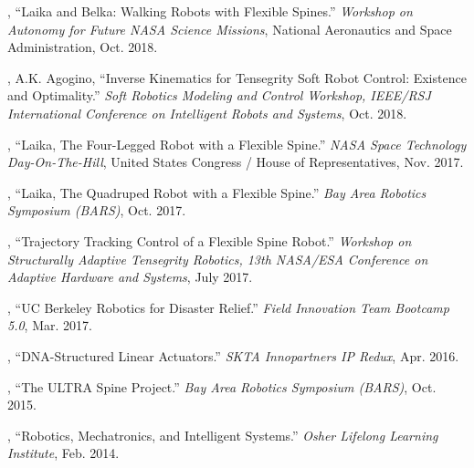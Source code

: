 \documentclass[letterpaper]{deedy-resume} %
\begin{document}
{\begin{etaremune}[itemsep=0.1cm]
\item \underline{{}}, ``Laika and Belka: Walking Robots with Flexible Spines.'' {\it Workshop on Autonomy for Future NASA Science Missions}, National Aeronautics and Space Administration, Oct. 2018.

\item \underline{{}}, A.K. Agogino, ``Inverse Kinematics for Tensegrity Soft Robot Control: Existence and Optimality.'' {\it Soft Robotics Modeling and Control Workshop, IEEE/RSJ International Conference on Intelligent Robots and Systems}, Oct. 2018.

\item \underline{{}}, ``Laika, The Four-Legged Robot with a Flexible Spine.'' {\it NASA Space Technology Day-On-The-Hill}, United States Congress / House of Representatives, Nov. 2017.

\item \underline{{}}, ``Laika, The Quadruped Robot with a Flexible Spine.'' {\it Bay Area Robotics Symposium (BARS)}, Oct. 2017.

\item \underline{{}}, ``Trajectory Tracking Control of a Flexible Spine Robot.'' {\it Workshop on Structurally Adaptive Tensegrity Robotics, 13th NASA/ESA Conference on Adaptive Hardware and Systems}, July 2017.

\item \underline{{}}, ``UC Berkeley Robotics for Disaster Relief.'' {\it Field Innovation Team Bootcamp 5.0}, Mar. 2017.

\item \underline{{}}, ``DNA-Structured Linear Actuators.'' {\it  SKTA Innopartners IP Redux}, Apr. 2016.

\item \underline{{}}, ``The ULTRA Spine Project.'' {\it Bay Area Robotics Symposium (BARS)}, Oct. 2015.

\item \underline{{}}, ``Robotics, Mechatronics, and Intelligent Systems.'' {\it Osher Lifelong Learning Institute}, Feb. 2014.

 \end{etaremune}



}
\end{document}
